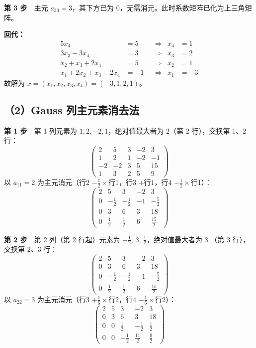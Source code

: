 \documentclass[a4paper,11pt]{ctexart}
\begin{document}
\textbf{第 3 步}　主元 $a_{33}=3$，其下方已为 $0$，无需消元。此时系数矩阵已化为上三角矩阵。

\textbf{回代：}
\[
  \begin{aligned}
    5x_4&=5 & &\Rightarrow & x_4&=1\\
    3x_3-3x_4&=3 & &\Rightarrow & x_3&=2\\
    x_2+x_3+2x_4&=5 & &\Rightarrow & x_2&=1\\
    x_1+2x_2+x_3-2x_4&=-1 & &\Rightarrow & x_1&=-3
  \end{aligned}
\]
故解为 $x=(x_1,x_2,x_3,x_4)=(-3,1,2,1)$。

\subsection*{（2）Gauss 列主元素消去法}

\textbf{第 1 步}　第 1 列元素为 $1,2,-2,1$，绝对值最大者为 $2$（第 2 行），交换第 1、2 行：
\[
  \left(\begin{array}{rrrr|r}
    2 & 5 & 3 & -2 & 3\\
    1 & 2 & 1 & -2 & -1\\
    -2 & -2 & 3 & 5 & 15\\
    1 & 3 & 2 & 5 & 9
  \end{array}\right)
\]
以 $a_{11}=2$ 为主元消元（行2 $-\tfrac12\times$行1，行3 $+$行1，行4 $-\tfrac12\times$行1）：
\[
  \left(\begin{array}{rrrr|r}
    2 & 5 & 3 & -2 & 3\\
    0 & -\tfrac12 & -\tfrac12 & -1 & -\tfrac52\\
    0 & 3 & 6 & 3 & 18\\
    0 & \tfrac12 & \tfrac12 & 6 & \tfrac{15}{2}
  \end{array}\right)
\]

\textbf{第 2 步}　第 2 列（第 2 行起）元素为 $-\tfrac12,\,3,\,\tfrac12$，绝对值最大者为 $3$
（第 3 行），交换第 2、3 行：
\[
  \left(\begin{array}{rrrr|r}
    2 & 5 & 3 & -2 & 3\\
    0 & 3 & 6 & 3 & 18\\
    0 & -\tfrac12 & -\tfrac12 & -1 & -\tfrac52\\
    0 & \tfrac12 & \tfrac12 & 6 & \tfrac{15}{2}
  \end{array}\right)
\]
以 $a_{22}=3$ 为主元消元（行3 $+\tfrac16\times$行2，行4 $-\tfrac16\times$行2）：
\[
  \left(\begin{array}{rrrr|r}
    2 & 5 & 3 & -2 & 3\\
    0 & 3 & 6 & 3 & 18\\
    0 & 0 & \tfrac12 & -\tfrac12 & \tfrac12\\
    0 & 0 & -\tfrac12 & \tfrac{11}{2} & \tfrac92
  \end{array}\right)
\]
\end{document}
